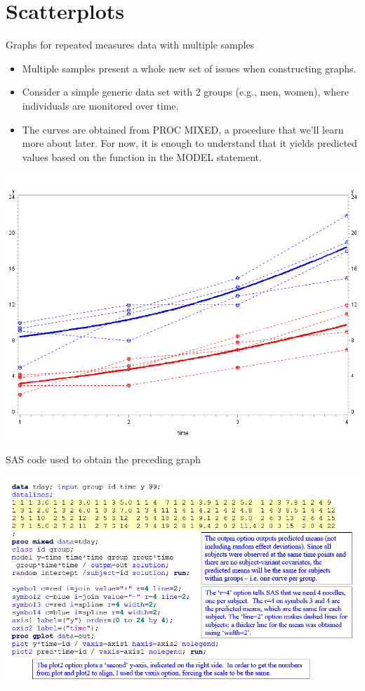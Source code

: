 \documentclass[
  9pt,
  ignorenonframetext,
]{beamer}
\providecommand{\tightlist}{%
  \setlength{\itemsep}{0pt}\setlength{\parskip}{0pt}}
\begin{document}
\hypertarget{scatterplots}{%
\section{Scatterplots}\label{scatterplots}}

\begin{frame}{Graphs for repeated measures data with multiple samples}
\protect\hypertarget{graphs-for-repeated-measures-data-with-multiple-samples}{}
\begin{itemize}
\tightlist
\item
  Multiple samples present a whole new set of issues when constructing
  graphs.\\
\item
  Consider a simple generic data set with 2 groups (e.g., men, women),
  where individuals are monitored over time.
\item
  The curves are obtained from PROC MIXED, a procedure that we'll learn
  more about later. For now, it is enough to understand that it yields
  predicted values based on the function in the MODEL statement. \tiny
\end{itemize}

\begin{center}\includegraphics[width=0.6\linewidth]{figs_L2/L2-f1} \end{center}

\tiny
\end{frame}

\begin{frame}{SAS code used to obtain the preceding graph}
\protect\hypertarget{sas-code-used-to-obtain-the-preceding-graph}{}
\tiny

\begin{center}\includegraphics[width=1\linewidth]{figs_L2/L2-f2} \end{center}

\tiny
\end{frame}
\end{document}
